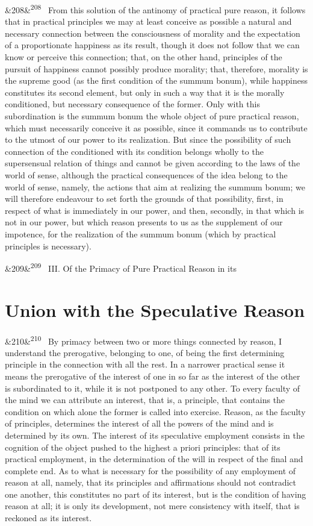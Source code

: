 \documentclass[12pt]{article}
\newcommand{\para}[1][]{\par\noindent\ifx&#1&\else\textsuperscript{\footnotesize #1}~\fi}
\begin{document}
\para[208] From this solution of the antinomy of practical pure reason, it follows that in practical principles we may at least conceive as possible a natural and necessary connection between the consciousness of morality and the expectation of a proportionate happiness as its result, though it does not follow that we can know or perceive this connection; that, on the other hand, principles of the pursuit of happiness cannot possibly produce morality; that, therefore, morality is the supreme good (as the first condition of the summum bonum), while happiness constitutes its second element, but only in such a way that it is the morally conditioned, but necessary consequence of the former. Only with this subordination is the summum bonum the whole object of pure practical reason, which must necessarily conceive it as possible, since it commands us to contribute to the utmost of our power to its realization. But since the possibility of such connection of the conditioned with its condition belongs wholly to the supersensual relation of things and cannot be given according to the laws of the world of sense, although the practical consequences of the idea belong to the world of sense, namely, the actions that aim at realizing the summum bonum; we will therefore endeavour to set forth the grounds of that possibility, first, in respect of what is immediately in our power, and then, secondly, in that which is not in our power, but which reason presents to us as the supplement of our impotence, for the realization of the summum bonum (which by practical principles is necessary).

\para[209] III. Of the Primacy of Pure Practical Reason in its

\section*{Union with the Speculative Reason}

\para[210] By primacy between two or more things connected by reason, I understand the prerogative, belonging to one, of being the first determining principle in the connection with all the rest. In a narrower practical sense it means the prerogative of the interest of one in so far as the interest of the other is subordinated to it, while it is not postponed to any other. To every faculty of the mind we can attribute an interest, that is, a principle, that contains the condition on which alone the former is called into exercise. Reason, as the faculty of principles, determines the interest of all the powers of the mind and is determined by its own. The interest of its speculative employment consists in the cognition of the object pushed to the highest a priori principles: that of its practical employment, in the determination of the will in respect of the final and complete end. As to what is necessary for the possibility of any employment of reason at all, namely, that its principles and affirmations should not contradict one another, this constitutes no part of its interest, but is the condition of having reason at all; it is only its development, not mere consistency with itself, that is reckoned as its interest.
\end{document}
